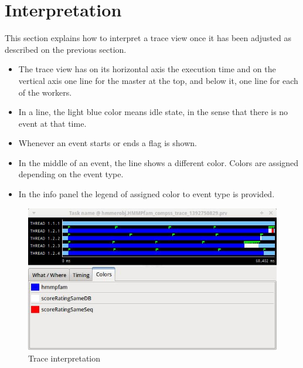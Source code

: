 \section{Interpretation}
\label{sec:Interpretation}

This section explains how to interpret a trace view once it has been adjusted as 
described on the previous section.

\begin{itemize}
 \item The trace view has on its horizontal axis the execution time and on the vertical 
       axis one line for the master at the top, and below it, one line for each of the workers.
 \item In a line, the light blue color means idle state, in the sense that there is no event at that time.
 \item Whenever an event starts or ends a flag is shown.
 \item In the middle of an event, the line shows a different color. Colors are assigned depending on the event type.
 \item In the info panel the legend of assigned color to event type is provided.
\end{itemize}

\begin{figure}[ht!]
  \centering
    \includegraphics[width=\textwidth]{./Sections/4_Interpretation/Figures/7.jpeg}
    \caption{Trace interpretation}
\end{figure}
